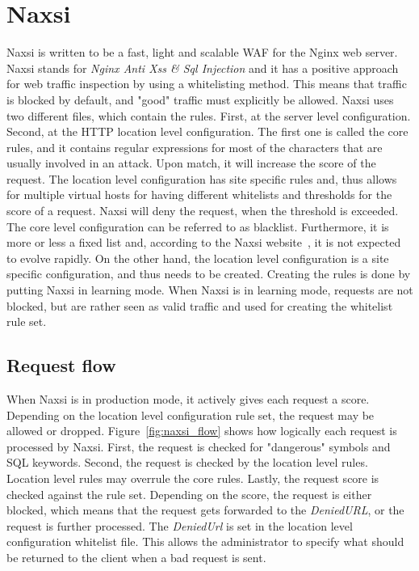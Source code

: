 \documentclass[Naxsi]{subfiles}
\begin{document}
\section{Naxsi}
\label{sec:Naxsi}
Naxsi is written to be a fast, light and scalable \ac{WAF} for the Nginx web server. Naxsi stands for \textit{Nginx Anti Xss \& Sql Injection} and it has a positive approach for web traffic inspection by using a whitelisting method. This means that traffic is blocked by default, and "good" traffic must explicitly be allowed. Naxsi uses two different files, which contain the rules. First, at the server level configuration. Second, at the HTTP location level configuration. The first one is called the core rules, and it contains regular expressions for most of the characters that are usually involved in an attack. Upon match, it will increase the score of the request. The location level configuration has site specific rules and, thus allows for multiple virtual hosts for having different whitelists and thresholds for the score of a request. Naxsi will deny the request, when the threshold is exceeded. The core level configuration can be referred to as blacklist. Furthermore, it is more or less a fixed list and, according to the Naxsi website~\cite{naxsi2013}, it is not expected to evolve rapidly. On the other hand, the location level configuration is a site specific configuration, and thus needs to be created. Creating the rules is done by putting Naxsi in learning mode. When Naxsi is in learning mode, requests are not blocked, but are rather seen as valid traffic and used for creating the whitelist rule set.

\subsection{Request flow}
When Naxsi is in production mode, it actively gives each request a score. Depending on the location level configuration rule set, the request may be allowed or dropped. Figure~\ref{fig:naxsi_flow} shows how logically each request is processed by Naxsi. First, the request is checked for "dangerous" symbols and SQL keywords. Second, the request is checked by the location level rules. Location level rules may overrule the core rules. Lastly, the request score is checked against the rule set. Depending on the score, the request is either blocked, which means that the request gets forwarded to the \textit{DeniedURL}, or the request is further processed. The \textit{DeniedUrl} is set in the location level configuration whitelist file. This allows the administrator to specify what should be returned to the client when a bad request is sent.
\end{document}
